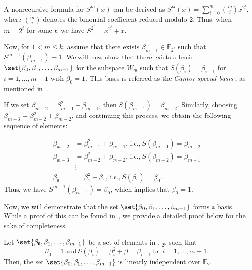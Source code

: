 A nonrecursive formula for $S^m(x)$ can be derived as $S^{m}(x)=\sum_{i=0}^{m} \binom{m}{i} x^{2^i}$, where $\binom{m}{i}$ denotes the binomial coefficient reduced modulo 2. Thus, when $m=2^{t}$ for some $t$, we have $S^{2^{t}}=x^{2^{t}}+x$.

Now, for $1<m\leq k$, assume that there exists $\beta_{m-1} \in \mathbb{F}_{2^k}$ such that $S^{m-1}(\beta_{m-1})=1$. We will now show that there exists a basis $\set{\beta_{0},\beta_{1},\ldots,\beta_{m-1}}$ for the subspace $W_{m}$ such that $S(\beta_{i})=\beta_{i-1}$ for $i=1,\ldots,m-1$ with $\beta_{0}=1$. This basis is referred as the \textit{Cantor special basis} , as mentioned  in~\cite{MateerThesis2008}.

If we set $\beta_{m-2} = \beta_{m-1}^2 + \beta_{m-1}$, then $S(\beta_{m-1}) = \beta_{m-2}$. Similarly, choosing $\beta_{m-3} = \beta_{m-2}^2 + \beta_{m-2}$, and continuing this process, we obtain the following sequence of elements:

\begin{equation}\label{Eqn_basis_cons}
	\begin{aligned}
		\beta_{m-2} &= \beta_{m-1}^2+ \beta_{m-1}\text{, i.e.,}~S(\beta_{m-1})=\beta_{m-2}\\
		\beta_{m-3} &= \beta_{m-2}^2+ \beta_{m-2}\text{, i.e.,}~S(\beta_{m-2})=\beta_{m-1}\\
		& \vdots \\
		\beta_{0} &= \beta_{1}^2+ \beta_{1}\text{, i.e.,}~S(\beta_{1})=\beta_{0}.
	\end{aligned}
\end{equation}
Thus, we have $S^{m-1}(\beta_{m-1})=\beta_{0}$, which implies that $\beta_{0}=1$. 

Now, we will demonstrate that the set $\set{\beta_{0}, \beta_{1},\ldots, \beta_{m-1}}$ forms a basis. While a proof of this can be found in~\cite[Appendix]{MateerThesis2008}, we provide a detailed proof below for the sake of completeness.

\begin{theorem}
	Let $\set{\beta_0,\beta_1,\ldots,\beta_{m-1}}$ be a set of elements in $\mathbb{F}_{2^k}$ such that 
	\[\beta_0=1~\text{and}~ S(\beta_i)=\beta_i^2+\beta=\beta_{i-1}~\text{for}~i=1,\ldots,m-1. \]
	Then, the set $\set{\beta_0,\beta_1,\ldots,\beta_{m-1}}$ is linearly independent over $\mathbb{F}_{2}$.
\end{theorem}

